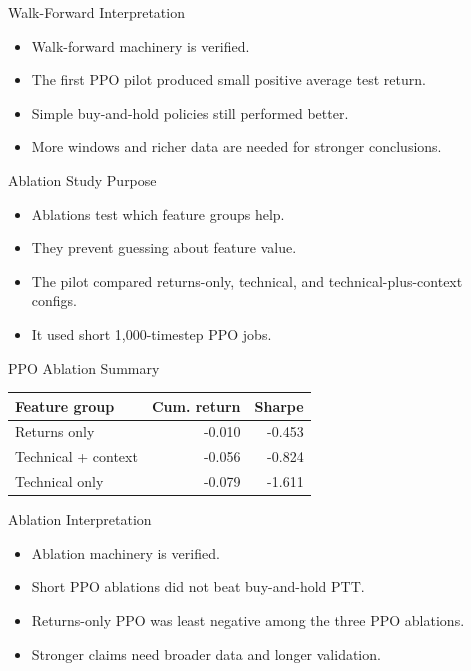 \documentclass[aspectratio=43,10pt]{beamer}
\begin{document}
\begin{frame}{Walk-Forward Interpretation}
\begin{itemize}
  \item Walk-forward machinery is verified.
  \item The first PPO pilot produced small positive average test return.
  \item Simple buy-and-hold policies still performed better.
  \item More windows and richer data are needed for stronger conclusions.
\end{itemize}
\end{frame}

\begin{frame}{Ablation Study Purpose}
\begin{itemize}
  \item Ablations test which feature groups help.
  \item They prevent guessing about feature value.
  \item The pilot compared returns-only, technical, and technical-plus-context configs.
  \item It used short 1,000-timestep PPO jobs.
\end{itemize}
\end{frame}

\begin{frame}{PPO Ablation Summary}
\begin{center}
\begin{tabular}{lrr}
\toprule
Feature group & Cum. return & Sharpe \\
\midrule
Returns only & -0.010 & -0.453 \\
Technical + context & -0.056 & -0.824 \\
Technical only & -0.079 & -1.611 \\
\bottomrule
\end{tabular}
\end{center}
\end{frame}

\begin{frame}{Ablation Interpretation}
\begin{itemize}
  \item Ablation machinery is verified.
  \item Short PPO ablations did not beat buy-and-hold PTT.
  \item Returns-only PPO was least negative among the three PPO ablations.
  \item Stronger claims need broader data and longer validation.
\end{itemize}
\end{frame}
\end{document}
